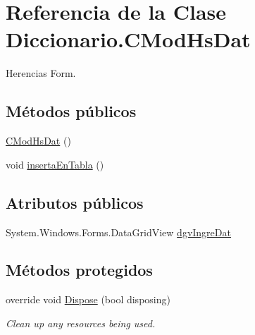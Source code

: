 \hypertarget{class_diccionario_1_1_c_mod_hs_dat}{\section{Referencia de la Clase Diccionario.\-C\-Mod\-Hs\-Dat}
\label{class_diccionario_1_1_c_mod_hs_dat}
}


Herencias Form.

\subsection*{Métodos públicos}
\begin{DoxyCompactItemize}
\item 
\hyperlink{class_diccionario_1_1_c_mod_hs_dat_a9dba5d188bc619467e3cd0cb54cf0067}{C\-Mod\-Hs\-Dat} ()
\item 
void \hyperlink{class_diccionario_1_1_c_mod_hs_dat_a7c3cc59ee30ae6d52c7024417899c687}{inserta\-En\-Tabla} ()
\end{DoxyCompactItemize}
\subsection*{Atributos públicos}
\begin{DoxyCompactItemize}
\item 
System.\-Windows.\-Forms.\-Data\-Grid\-View \hyperlink{class_diccionario_1_1_c_mod_hs_dat_a859e3776dee780dce40d21ba1eb8f1e5}{dgv\-Ingre\-Dat}
\end{DoxyCompactItemize}
\subsection*{Métodos protegidos}
\begin{DoxyCompactItemize}
\item 
override void \hyperlink{class_diccionario_1_1_c_mod_hs_dat_a93ab330b9de9940f8a8ed63bdfe67861}{Dispose} (bool disposing)
\begin{DoxyCompactList}\small\item\em Clean up any resources being used. \end{DoxyCompactList}\end{DoxyCompactItemize}
